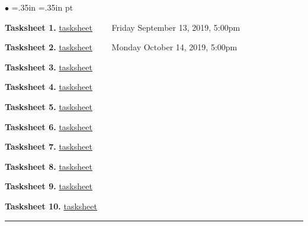 \documentclass[10pt,fleqn]{article}
\begin{document}
\begin{list}{$\bullet$}{ \parsep=0pt \listparindent=0pt
\topsep=0pt \rightmargin=.35in \leftmargin=.35in  pt
\itemsep=2pt}
  \item {\bf Tasksheet 1.}
   \href{../../tasksheets/html/tasksheet_01.html}{tasksheet} \ \ \ \  Friday September 13, 2019, 5:00pm 
  \item {\bf Tasksheet 2.}
   \href{https://jvkoebbe.github.io/math4610/tasksheets/html/tasksheet_02.html}{tasksheet}  \ \ \ \ Monday October 14, 2019, 5:00pm 
  \item {\bf Tasksheet 3.}
   \href{https://jvkoebbe.github.io/math4610/tasksheets/html/tasksheet_03.html}{tasksheet}
  \item {\bf Tasksheet 4.}
   \href{https://jvkoebbe.github.io/math4610/tasksheets/html/tasksheet_04.html}{tasksheet}
  \item {\bf Tasksheet 5.}
   \href{https://jvkoebbe.github.io/math4610/tasksheets/html/tasksheet_05.html}{tasksheet}
  \item {\bf Tasksheet 6.}
   \href{https://jvkoebbe.github.io/math4610/tasksheets/html/tasksheet_06.html}{tasksheet}
  \item {\bf Tasksheet 7.}
   \href{https://jvkoebbe.github.io/math4610/tasksheets/html/tasksheet_07.html}{tasksheet}
  \item {\bf Tasksheet 8.}
   \href{https://jvkoebbe.github.io/math4610/tasksheets/html/tasksheet_08.html}{tasksheet}
  \item {\bf Tasksheet 9.}
   \href{https://jvkoebbe.github.io/math4610/tasksheets/html/tasksheet_09.html}{tasksheet}
  \item {\bf Tasksheet 10.}
   \href{https://jvkoebbe.github.io/math4610/tasksheets/html/tasksheet_10.html}{tasksheet}
\end{list}
\vskip0.1in\hrule\vskip0.1in
\end{document}
